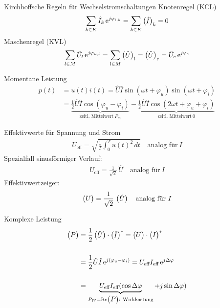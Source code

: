\documentclass[a6paper]{kartei}
\DeclareMathOperator{\re}{Re}
\begin{document}
\begin{karte}{Kirchhoffsche Regeln für Wechselstromschaltungen}
Knotenregel (KCL)
\begin{align}
\sum \limits_{k \in K} \hat{I}_{k} \operatorname{e}^{j \varphi_{i,k}} = \sum \limits_{k \in K} \begin{pmatrix} \hat{I} \end{pmatrix}_{k} = 0
\end{align}
Maschenregel (KVL)
\begin{align}
\sum \limits_{l \in M} \hat{U}_{l} \operatorname{e}^{j \varphi_{u,l}} = \sum \limits_{l \in M} \begin{pmatrix} \hat{U} \end{pmatrix}_{l} = \begin{pmatrix} \hat{U} \end{pmatrix}_{e} = \hat{U}_{e} \operatorname{e}^{j\varphi_{e}}
\end{align}
\end{karte}


\begin{karte}{Momentane Leistung}
\begin{align}
p(t) & = u(t)i(t) = \hat{U} \hat{I} \sin(\omega t + \varphi_{u}) \sin(\omega t + \varphi_{i}) \nonumber \\
      & = \underbrace{\frac{1}{2} \hat{U} \hat{I} \cos(\varphi_{u} - \varphi_{i})}_{\text{zeitl. Mittelwert} \ P_{m}} - \underbrace{\frac{1}{2} \hat{U} \hat{I} \cos(2 \omega t + \varphi_{u} + \varphi_{i})}_{\text{zeitl. Mittelwert} \ 0}
\end{align}
\end{karte}

\begin{karte}{Effektivwerte für Spannung und Strom}
\begin{align} U_{\text{eff}} = \sqrt{\frac{1}{T} \int_{0}^{T} u(t)^{2} \, dt} \quad \text{analog für} \ I \end{align}
Spezialfall sinusförmiger Verlauf:
\begin{align} U_{\text{eff}} = \frac{1}{\sqrt{2}} \, \hat{U} \quad \text{analog für} \ I \end{align}
Effektivwertzeiger:
\begin{align} \begin{pmatrix} U \end{pmatrix} = \frac{1}{\sqrt{2}} \, \begin{pmatrix} \hat{U} \end{pmatrix} \quad \text{analog für} \ I \end{align}
\end{karte}

\begin{karte}{Komplexe Leistung}
\begin{align}
\vect{P} &= \frac{1}{2} \vect{\hat{U}} \cdot \vect{\hat{I}}^{*} = \vect{U} \cdot \vect{I}^{*} \nonumber \\ \nonumber \\
&= \frac{1}{2} \hat{U} \hat{I} \operatorname{e}^{j(\varphi_{u}-\varphi_{i})} = U_{\text{eff}} I_{\text{eff}} \operatorname{e}^{j\Delta \varphi} \nonumber \\ \nonumber \\
& = \underbrace{U_{\text{eff}} I_{\text{eff}} (\cos \Delta \varphi}_{P_{W} = \re \vect{P}: \ \text{Wirkleistung}} + j \sin \Delta \varphi)
\end{align}
\end{karte}
\end{document}
